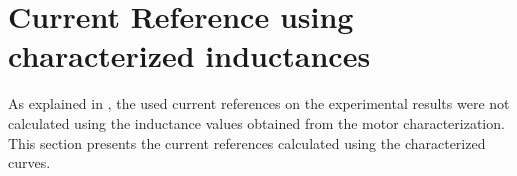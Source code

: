 \chapter{Current Reference using characterized inductances}
\label{chapter:appendix_current_reference}

As explained in , the used current references on the experimental results were not calculated using the inductance values obtained from the motor characterization. This section presents the current references calculated using the characterized curves.

